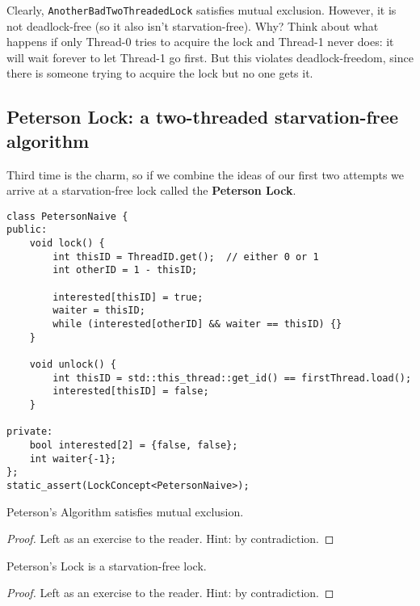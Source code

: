 Clearly, \verb|AnotherBadTwoThreadedLock| satisfies mutual exclusion. However, it is not deadlock-free (so it also isn't starvation-free). Why? Think about what happens if only Thread-0 tries to acquire the lock and Thread-1 never does:  it will wait forever to let Thread-1 go first. But this violates deadlock-freedom, since there is someone trying to acquire the lock but no one gets it.

\subsection{Peterson Lock: a two-threaded starvation-free algorithm} \label{sec:PetersonLock}
Third time is the charm, so if we combine the ideas of our first two attempts we arrive at a starvation-free lock called the \textbf{Peterson Lock}.

\makebox[\linewidth]{\rule{17cm}{0.4pt}}
{\centering \label{code:peterson_lock}
\begin{verbatim}
class PetersonNaive {
public:
    void lock() {
        int thisID = ThreadID.get();  // either 0 or 1
        int otherID = 1 - thisID;
        
        interested[thisID] = true;
        waiter = thisID;
        while (interested[otherID] && waiter == thisID) {}
    }

    void unlock() {
        int thisID = std::this_thread::get_id() == firstThread.load();
        interested[thisID] = false;
    }

private:
    bool interested[2] = {false, false};
    int waiter{-1};
};
static_assert(LockConcept<PetersonNaive>);
\end{verbatim}

}
\makebox[\linewidth]{\rule{17cm}{0.4pt}}

\begin{claim} \label{peterson_mutex}
Peterson's Algorithm satisfies mutual exclusion.
\end{claim}
\begin{proof}
    Left as an exercise to the reader. Hint: by contradiction.
\end{proof}

\begin{claim} \label{peterson_starvation_free}
Peterson's Lock is a starvation-free lock.
\end{claim}
\begin{proof}
    Left as an exercise to the reader. Hint: by contradiction.
\end{proof}

